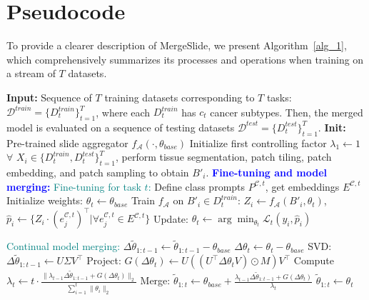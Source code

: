 \documentclass[10pt,twocolumn,letterpaper]{article}
\begin{document}
\section{Pseudocode}\label{sec:pseudocode}

To provide a clearer description of MergeSlide, we present Algorithm~\ref{alg_1}, which comprehensively summarizes its processes and operations when training on a stream of $T$ datasets.

\begin{algorithm}
\scriptsize
\caption{MergeSlide} \label{alg_1}
\begin{algorithmic}[1]
\State \textbf{Input:} Sequence of $T$ training datasets corresponding to $T$ tasks: $\mathcal{D}^{train} = \{D^{train}_t\}_{t=1}^{T}$, where each $D^{train}_t$ has $c_t$ cancer subtypes. Then, the merged model is evaluated on a sequence of testing datasets $\mathcal{D}^{test} = \{D^{test}_t\}_{t=1}^{T}$.
\State \textbf{Init:} Pre-trained slide aggregator $f_{\mathcal{A}}(\cdot, \theta_{base})$
\State Initialize first controlling factor $\lambda_1 \leftarrow 1$
\State $\forall$ $X_i \in \{D^{{train}}_t, D^{{test}}_t\}_{t=1}^T$, perform tissue segmentation, patch tiling, patch embedding, and patch sampling to obtain $B'_i$.
\State \textcolor{blue}{\textbf{Fine-tuning and model merging:}}
\State \textcolor{teal}{Fine-tuning for task $t$:} 
\State Define class prompts $P^{\mathcal{C},t}$, get embeddings $E^{\mathcal{C},t}$
\State Initialize weights: $\theta_t \leftarrow \theta_{base}$
\State Train $f_{\mathcal{A}}$ on $B'_i \in D^{train}_t$: 
\State \hspace{1em} $Z_i \leftarrow f_{\mathcal{A}}(B'_i, \theta_t)$, \quad $\hat{p}_i \leftarrow \{Z_i \cdot (e^{\mathcal{C},{t}}_{j})^\top\vert\forall e^{\mathcal{C},{t}}_{j}\in E^{\mathcal{C},t}\}$
\State Update: $\theta_t \leftarrow \arg\min_{\theta_t} \mathcal{L}_t(y_i, \hat{p}_i)$

\State \textcolor{teal}{Continual model merging:} 
\State $\Delta\tilde{\theta}_{1:t-1} \leftarrow \tilde{\theta}_{1:t-1} - \theta_{base}$
\State $\Delta\theta_t \leftarrow \theta_t - \theta_{base}$
\State SVD: $\Delta\tilde{\theta}_{1:t-1} \leftarrow U \Sigma V^\top$
\State Project: $G(\Delta\theta_t) \leftarrow U \left( (U^\top \Delta\theta_t V) \odot M \right) V^\top$ 
\State Compute $\lambda_t \leftarrow t \cdot \frac{\| \lambda_{t-1} \Delta\tilde{\theta}_{1:t-1} + G(\Delta\theta_t) \|_2}{\sum_{i=1}^{t} \| \theta_i \|_2}$ 
\State Merge: $\tilde{\theta}_{1:t} \leftarrow \theta_{base} + \frac{\lambda_{t-1} \Delta\tilde{\theta}_{1:t-1} + G(\Delta\theta_t)}{\lambda_t}$ 
\Else
\State $\tilde{\theta}_{1:t} \leftarrow \theta_t$
\EndIf
\EndFor


\end{algorithmic}
\end{algorithm}
\end{document}

